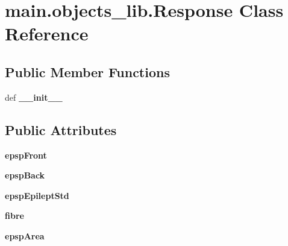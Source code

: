 \hypertarget{classmain_1_1objects__lib_1_1_response}{\section{main.\-objects\-\_\-lib.\-Response Class Reference}
\label{classmain_1_1objects__lib_1_1_response}
}
\subsection*{Public Member Functions}
\begin{DoxyCompactItemize}
\item 
\hypertarget{classmain_1_1objects__lib_1_1_response_ac9544849f6abfe64908561caa6387280}{def {\bfseries \-\_\-\-\_\-init\-\_\-\-\_\-}}\label{classmain_1_1objects__lib_1_1_response_ac9544849f6abfe64908561caa6387280}

\end{DoxyCompactItemize}
\subsection*{Public Attributes}
\begin{DoxyCompactItemize}
\item 
\hypertarget{classmain_1_1objects__lib_1_1_response_ab6f23603a45be2336b3d1c31662b44fc}{{\bfseries epsp\-Front}}\label{classmain_1_1objects__lib_1_1_response_ab6f23603a45be2336b3d1c31662b44fc}

\item 
\hypertarget{classmain_1_1objects__lib_1_1_response_a28803f03692a76cbc8cfacb0cbabb82f}{{\bfseries epsp\-Back}}\label{classmain_1_1objects__lib_1_1_response_a28803f03692a76cbc8cfacb0cbabb82f}

\item 
\hypertarget{classmain_1_1objects__lib_1_1_response_ae26070df8764b6498c2e80d805fbec9f}{{\bfseries epsp\-Epilept\-Std}}\label{classmain_1_1objects__lib_1_1_response_ae26070df8764b6498c2e80d805fbec9f}

\item 
\hypertarget{classmain_1_1objects__lib_1_1_response_a62727276da5815103a4d337146c111ca}{{\bfseries fibre}}\label{classmain_1_1objects__lib_1_1_response_a62727276da5815103a4d337146c111ca}

\item 
\hypertarget{classmain_1_1objects__lib_1_1_response_a8da58ce9eaa0a2abb13f228e722eeb54}{{\bfseries epsp\-Area}}\label{classmain_1_1objects__lib_1_1_response_a8da58ce9eaa0a2abb13f228e722eeb54}

\end{DoxyCompactItemize}


